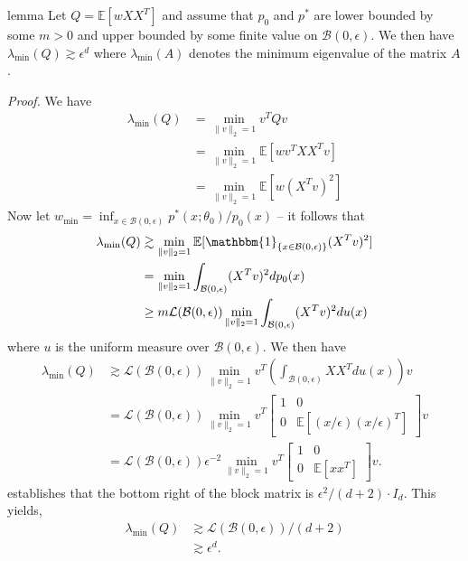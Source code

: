 \documentclass[11pt]{article}
\begin{document}
\begin{restatable}{lemma}{}
    Let $Q = \mathbb{E}\left[wXX^T\right]$
    and assume that $p_0$ and $p^*$ are lower bounded by some $m > 0$ and upper bounded by some finite value on $\mathcal{B}(0, \epsilon)$. We then have
    $\lambda_{\min}(Q) \gtrsim \epsilon^d$ where $\lambda_{\min}(A)$ denotes the minimum eigenvalue of the matrix $A$. 
    \label{lemma: Q op norm}
\end{restatable}
\noindent \textit{Proof.} We have
\begin{align*}
    \lambda_{\min}(Q) &= \min_{\|v\|_2 = 1}v^TQv \\
    &= \min_{\|v\|_2 = 1} \mathbb{E}[wv^TXX^Tv] \\
    &= \min_{\|v\|_2 = 1} \mathbb{E}[w(X^Tv)^2]
\end{align*}
Now let $w_{\min} = \inf_{x \in \mathcal{B}(0, \epsilon)}p^*(x; \theta_0)/p_0(x)$ -- it follows that
\begin{align*}
    \lambda_{\min}(Q) &\gtrsim \min_{\|v\|_2 = 1}\mathbb{E}[\mathbbm{1}_{\{x \in \mathcal{B}(0, \epsilon)\}}(X^Tv)^2] \\
    &= \min_{\|v\|_2 = 1}\int_{\mathcal{B}(0, \epsilon)}(X^Tv)^2 dp_0(x) \\
    &\geq m \mathcal{L}(\mathcal{B}(0, \epsilon))\min_{\|v\|_2 = 1}\int_{\mathcal{B}(0, \epsilon)}(X^Tv)^2 du(x)
\end{align*}
where $u$ is the uniform measure over $\mathcal{B}(0, \epsilon)$. We then have
\begin{align*}
    \lambda_{\min}(Q) &\gtrsim \mathcal{L}(\mathcal{B}(0, \epsilon))\min_{\|v\|_2 = 1} v^T\left(\int_{\mathcal{B}(0, \epsilon)}XX^T du(x)\right)v \\
    &= \mathcal{L}(\mathcal{B}(0, \epsilon))\min_{\|v\|_2 = 1} v^T\begin{bmatrix}
        1 & 0 \\
        0 & \mathbb{E}[(x/\epsilon)(x/\epsilon)^T]
    \end{bmatrix}v \\
    &= \mathcal{L}(\mathcal{B}(0, \epsilon))\epsilon^{-2}\min_{\|v\|_2 = 1} v^T\begin{bmatrix}
        1 & 0 \\
        0 & \mathbb{E}[xx^T]
    \end{bmatrix}v.
\end{align*}
 establishes that the bottom right of the block matrix is $\epsilon^2/(d+2) \cdot I_d$. This yields,
\begin{align*}
    \lambda_{\min}(Q) &\gtrsim \mathcal{L}(\mathcal{B}(0, \epsilon))/(d+2) \\
    &\gtrsim \epsilon^d. 
\end{align*}
\end{document}

